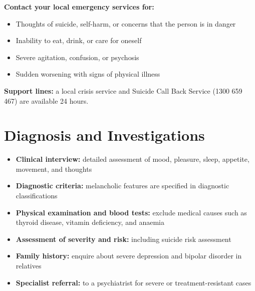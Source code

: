 \textbf{Contact your local emergency services for:}
\begin{itemize}
    \item Thoughts of suicide, self-harm, or concerns that the person is in danger
    \item Inability to eat, drink, or care for oneself
    \item Severe agitation, confusion, or psychosis
    \item Sudden worsening with signs of physical illness
\end{itemize}
\textbf{Support lines:} a local crisis service and Suicide Call Back Service (1300 659 467) are available 24 hours.

\section*{Diagnosis and Investigations}
\begin{itemize}
    \item \textbf{Clinical interview:} detailed assessment of mood, pleasure, sleep, appetite, movement, and thoughts
    \item \textbf{Diagnostic criteria:} melancholic features are specified in diagnostic classifications
    \item \textbf{Physical examination and blood tests:} exclude medical causes such as thyroid disease, vitamin deficiency, and anaemia
    \item \textbf{Assessment of severity and risk:} including suicide risk assessment
    \item \textbf{Family history:} enquire about severe depression and bipolar disorder in relatives
    \item \textbf{Specialist referral:} to a psychiatrist for severe or treatment-resistant cases
\end{itemize}


